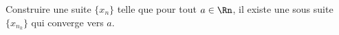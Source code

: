 
\begin{exercice}\label{exo0015}

Construire une suite $\{x_n\}$ telle que pour tout $a\in \Rn$, il existe une sous suite $\{x_{n_k}\}$ qui converge vers $a$.

\end{exercice}
